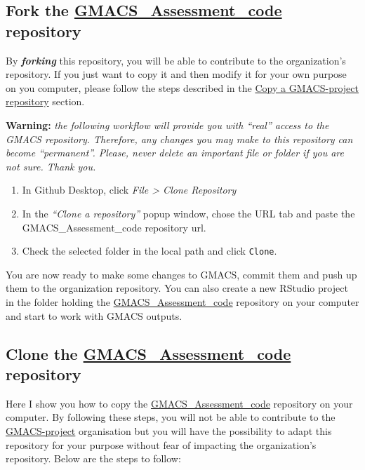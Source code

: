 \documentclass[
]{article}
\providecommand{\tightlist}{%
  \setlength{\itemsep}{0pt}\setlength{\parskip}{0pt}}
\begin{document}
\hypertarget{Fork-repo}{%
\subsection{\texorpdfstring{Fork the
\href{https://github.com/GMACS-project/GMACS_Assessment_code}{GMACS\_Assessment\_code}
repository}{Fork the GMACS\_Assessment\_code repository}}\label{Fork-repo}}

By \textbf{\emph{forking}} this repository, you will be able to
contribute to the organization's repository. If you just want to copy it
and then modify it for your own purpose on you computer, please follow
the steps described in the \protect\hyperlink{Copy-repo}{Copy a
GMACS-project repository} section.

\textbf{Warning:} \emph{the following workflow will provide you with
``real'' access to the GMACS repository. Therefore, any changes you may
make to this repository can become ``permanent''. Please, never delete
an important file or folder if you are not sure. Thank you.}

\begin{enumerate}
\def\labelenumi{\arabic{enumi}.}
\tightlist
\item
  In Github Desktop, click \emph{File \textgreater{} Clone Repository}
\item
  In the \emph{``Clone a repository''} popup window, chose the URL tab
  and paste the GMACS\_Assessment\_code repository url.
\item
  Check the selected folder in the local path and click \texttt{Clone}.
\end{enumerate}

You are now ready to make some changes to GMACS, commit them and push up
them to the organization repository. You can also create a new RStudio
project in the folder holding the
\href{https://github.com/GMACS-project/GMACS_Assessment_code}{GMACS\_Assessment\_code}
repository on your computer and start to work with GMACS outputs.

\hypertarget{Copy-repo}{%
\subsection{\texorpdfstring{Clone the
\href{https://github.com/GMACS-project/GMACS_Assessment_code}{GMACS\_Assessment\_code}
repository}{Clone the GMACS\_Assessment\_code repository}}\label{Copy-repo}}

Here I show you how to copy the
\href{https://github.com/GMACS-project/GMACS_Assessment_code}{GMACS\_Assessment\_code}
repository on your computer. By following these steps, you will not be
able to contribute to the
\href{https://github.com/GMACS-project}{GMACS-project} organisation but
you will have the possibility to adapt this repository for your purpose
without fear of impacting the organization's repository. Below are the
steps to follow:
\end{document}
